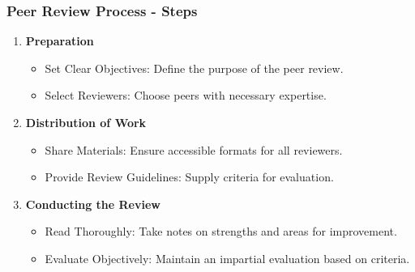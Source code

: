 \documentclass{beamer}
\begin{document}
\begin{frame}[fragile]
    \frametitle{Peer Review Process - Steps}
    \begin{enumerate}
        \item \textbf{Preparation}
            \begin{itemize}
                \item Set Clear Objectives: Define the purpose of the peer review.
                \item Select Reviewers: Choose peers with necessary expertise.
            \end{itemize}
        \item \textbf{Distribution of Work}
            \begin{itemize}
                \item Share Materials: Ensure accessible formats for all reviewers.
                \item Provide Review Guidelines: Supply criteria for evaluation.
            \end{itemize}
        \item \textbf{Conducting the Review}
            \begin{itemize}
                \item Read Thoroughly: Take notes on strengths and areas for improvement.
                \item Evaluate Objectively: Maintain an impartial evaluation based on criteria.
            \end{itemize}
    \end{enumerate}
\end{frame}
\end{document}
